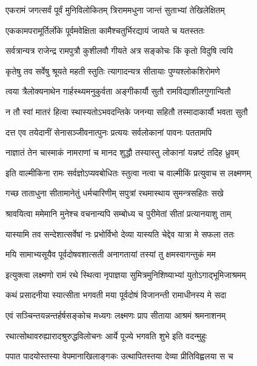 \twolineshloka
{एकरामं जगत्सर्वं पूर्वं मुनिविलोकितम्}
{त्रिराममधुना जान्तं सुताभ्यां तेखिलेक्षितम्}%

\twolineshloka
{एककामपरामूर्तिर्लोके पूर्वमवेक्षिता}
{कामैश्चतुर्भिरद्यायं जायते च यतस्ततः}%

\twolineshloka
{सर्वत्रान्यत्र राजेन्द्र रामपुत्रौ कुशीलवौ}
{गीयते अत्र सङ्कोचः किं कृतो विदुषि त्वयि}%

\twolineshloka
{कृतेषु तव सर्वेषु श्रूयते महती स्तुतिः}
{त्यागादन्यत्र सीतायाः पुण्यश्लोकशिरोमणे}%

\twolineshloka
{त्वया त्रैलोक्यनाथेन गार्हस्थ्यमनुकुर्वता}
{अङ्गीकार्यौ सुतौ रामविद्याशीलगुणान्वितौ}%

\twolineshloka
{न तौ स्वां मातरं हित्वा स्थास्यतोऽभवदन्तिके}
{जनन्या सहितौ तस्मादाकार्यौ भवता सुतौ}%

\twolineshloka
{दत्त एव तयेदानीं सेनासञ्जीवनात्पुनः}
{प्रत्ययः सर्वलोकानां पावनः पततामपि}%

\twolineshloka
{नाज्ञातं तेन चास्माकं नामराणां च मानद}
{शुद्धौ तस्यास्तु लोकानां यन्नष्टं तदिह ध्रुवम्}%


\twolineshloka
{इति वाल्मीकिना रामः सर्वज्ञोऽप्यवबोधितः}
{स्तुत्वा नत्वा च वाल्मीकिं प्रत्युवाच स लक्ष्मणम्}%

\twolineshloka
{गच्छ ताताधुना सीतामानेतुं धर्मचारिणीम्}
{सपुत्रां रथमास्थाय सुमन्त्रसहितः सखे}%

\twolineshloka
{श्रावयित्वा ममेमानि मुनेश्च वचनान्यपि}
{सम्बोध्य च पुरीमेतां सीतां प्रत्यानयाशु ताम्}%


\twolineshloka
{यास्यामि तव सन्देशात्सर्वेषां नः प्रभोर्विभो}
{देव्या यास्यति चेद्देव यात्रा मे सफला ततः}%

\twolineshloka
{मयि सामाभ्यसूयैव पूर्वदोषवशात्सती}
{अनागतायां तस्यां तु क्षमस्वागन्तुकं मम}%

\twolineshloka
{इत्युक्त्वा लक्ष्मणो रामं रथे स्थित्वा नृपाज्ञया}
{सुमित्रमुनिशिष्याभ्यां युतोऽगाद्भूमिजाश्रमम्}%

\twolineshloka
{कथं प्रसादनीया स्यात्सीता भगवती मया}
{पूर्वदोषं विजानन्ती रामाधीनस्य मे सदा}%

\twolineshloka
{एवं सञ्चिन्तयन्नन्तर्हर्षसङ्कोच मध्यगः}
{लक्ष्मणः प्राप सीताया आश्रमं श्रमनाशनम्}%

\twolineshloka
{रथात्सोथावरुह्यारादश्रुरुद्धविलोचनः}
{आर्ये पूज्ये भगवति शुभे इति वदन्मुहुः}%

\twolineshloka
{पपात पादयोस्तस्या वेपमानाखिलाङ्गकः}
{उत्थापितस्तया देव्या प्रीतिविह्वलया स च}%


